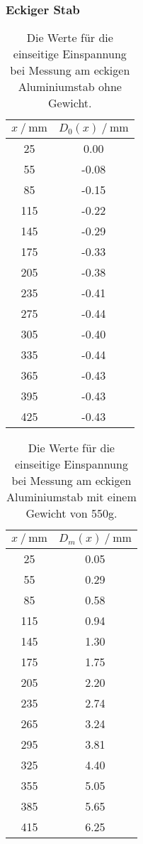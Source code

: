 \subsubsection{Eckiger Stab}
\label{sec:Eckiger Stab}

\begin{table}[H]
  \centering
  \caption{Die Werte für die einseitige Einspannung bei Messung am eckigen Aluminiumstab ohne Gewicht.}
  \begin{tabular}{cc}
    \toprule
    {$x \mathbin{/} \unit{\milli\metre}$} &
    {$D_0(x) \mathbin{/} \unit{\milli\metre}$} \\
    \midrule
     25 &  0.00 \\
     55 & -0.08 \\
     85 & -0.15 \\
    115 & -0.22 \\
    145 & -0.29 \\
    175 & -0.33 \\   
    205 & -0.38 \\
    235 & -0.41 \\
    275 & -0.44 \\
    305 & -0.40 \\
    335 & -0.44 \\
    365 & -0.43 \\
    395 & -0.43 \\
    425 & -0.43 \\
    
    \bottomrule
  \end{tabular}
  \label{tab:Tabelle3}
\end{table}

\begin{table}[H]
  \centering
  \caption{Die Werte für die einseitige Einspannung bei Messung am eckigen Aluminiumstab mit einem Gewicht von 550g.}
  \begin{tabular}{cc}
    \toprule
    {$x \mathbin{/} \unit{\milli\metre}$} &
    {$D_m(x) \mathbin{/} \unit{\milli\metre}$} \\
    \midrule
     25 & 0.05 \\
     55 & 0.29 \\
     85 & 0.58 \\
    115 & 0.94 \\
    145 & 1.30 \\ 
    175 & 1.75 \\
    205 & 2.20 \\    
    235 & 2.74 \\
    265 & 3.24 \\
    295 & 3.81 \\
    325 & 4.40 \\
    355 & 5.05 \\
    385 & 5.65 \\
    415 & 6.25 \\
    
    \bottomrule
  \end{tabular}
  \label{tab:Tabelle4}
\end{table}


